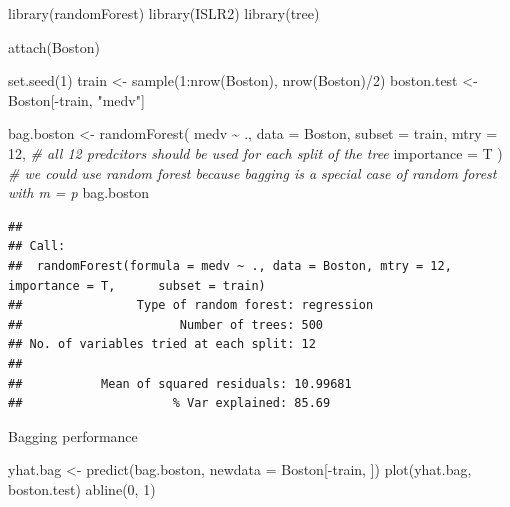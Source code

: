 \documentclass[
]{book}
\newenvironment{Shaded}{\begin{snugshade}}{\end{snugshade}}
\newcommand{\AttributeTok}[1]{\textcolor[rgb]{0.77,0.63,0.00}{#1}}
\newcommand{\CommentTok}[1]{\textcolor[rgb]{0.56,0.35,0.01}{\textit{#1}}}
\newcommand{\DecValTok}[1]{\textcolor[rgb]{0.00,0.00,0.81}{#1}}
\newcommand{\FunctionTok}[1]{\textcolor[rgb]{0.00,0.00,0.00}{#1}}
\newcommand{\NormalTok}[1]{#1}
\newcommand{\OtherTok}[1]{\textcolor[rgb]{0.56,0.35,0.01}{#1}}
\newcommand{\SpecialCharTok}[1]{\textcolor[rgb]{0.00,0.00,0.00}{#1}}
\newcommand{\StringTok}[1]{\textcolor[rgb]{0.31,0.60,0.02}{#1}}
\begin{document}
\begin{Shaded}
\begin{Highlighting}[]
\FunctionTok{library}\NormalTok{(randomForest)}
\FunctionTok{library}\NormalTok{(ISLR2)}
\FunctionTok{library}\NormalTok{(tree)}

\FunctionTok{attach}\NormalTok{(Boston)}


\FunctionTok{set.seed}\NormalTok{(}\DecValTok{1}\NormalTok{)}
\NormalTok{train }\OtherTok{\textless{}{-}} \FunctionTok{sample}\NormalTok{(}\DecValTok{1}\SpecialCharTok{:}\FunctionTok{nrow}\NormalTok{(Boston), }\FunctionTok{nrow}\NormalTok{(Boston)}\SpecialCharTok{/}\DecValTok{2}\NormalTok{)}
\NormalTok{boston.test }\OtherTok{\textless{}{-}}\NormalTok{ Boston[}\SpecialCharTok{{-}}\NormalTok{train, }\StringTok{"medv"}\NormalTok{]}

\NormalTok{bag.boston }\OtherTok{\textless{}{-}}
    \FunctionTok{randomForest}\NormalTok{(}
\NormalTok{        medv }\SpecialCharTok{\textasciitilde{}}\NormalTok{ .,}
        \AttributeTok{data =}\NormalTok{ Boston,}
        \AttributeTok{subset =}\NormalTok{ train,}
        \AttributeTok{mtry =} \DecValTok{12}\NormalTok{, }\CommentTok{\# all 12 predcitors should be used for each split of the tree }
        \AttributeTok{importance =}\NormalTok{ T}
\NormalTok{    ) }\CommentTok{\# we could use random forest because bagging is a special case of random forest with m = p}
\NormalTok{bag.boston}
\end{Highlighting}
\end{Shaded}

\begin{verbatim}
## 
## Call:
##  randomForest(formula = medv ~ ., data = Boston, mtry = 12, importance = T,      subset = train) 
##                Type of random forest: regression
##                      Number of trees: 500
## No. of variables tried at each split: 12
## 
##           Mean of squared residuals: 10.99681
##                     % Var explained: 85.69
\end{verbatim}

Bagging performance

\begin{Shaded}
\begin{Highlighting}[]
\NormalTok{yhat.bag }\OtherTok{\textless{}{-}} \FunctionTok{predict}\NormalTok{(bag.boston, }\AttributeTok{newdata =}\NormalTok{ Boston[}\SpecialCharTok{{-}}\NormalTok{train, ])}
\FunctionTok{plot}\NormalTok{(yhat.bag, boston.test)}
\FunctionTok{abline}\NormalTok{(}\DecValTok{0}\NormalTok{, }\DecValTok{1}\NormalTok{)}
\end{Highlighting}
\end{Shaded}
\end{document}
